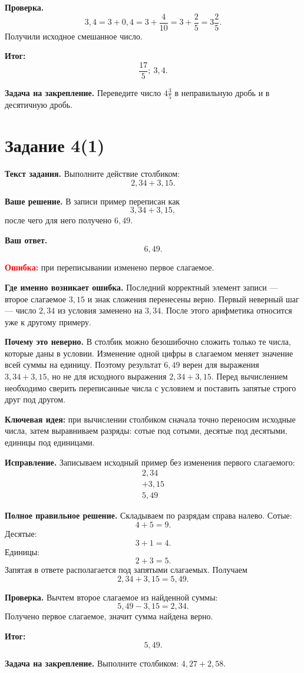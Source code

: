 \documentclass[12pt,a4paper]{article}
\begin{document}
\textbf{Проверка.}
\[
3{,}4=3+0{,}4=3+\frac{4}{10}=3+\frac25=3\frac25.
\]
Получили исходное смешанное число.

\textcolor{teal!60!black}{\textbf{Итог:}}
\[
\boxed{\frac{17}{5};\ 3{,}4}.
\]

\textbf{Задача на закрепление.}
Переведите число $4\frac35$ в неправильную дробь и в десятичную дробь.

\newpage
{}\label{task:4-1}
\section*{Задание 4(1)}

\textbf{Текст задания.}
Выполните действие столбиком:
\[
2{,}34+3{,}15.
\]

\textbf{Ваше решение.}
В записи пример переписан как
\[
3{,}34+3{,}15,
\]
после чего для него получено $6{,}49$.

\textbf{Ваш ответ.}
\[
6{,}49.
\]

\textcolor{red}{\textbf{Ошибка:}} при переписывании изменено первое слагаемое.

\textbf{Где именно возникает ошибка.}
Последний корректный элемент записи --- второе слагаемое $3{,}15$ и знак сложения перенесены верно. Первый неверный шаг --- число $2{,}34$ из условия заменено на $3{,}34$. После этого арифметика относится уже к другому примеру.

\textbf{Почему это неверно.}
В столбик можно безошибочно сложить только те числа, которые даны в условии. Изменение одной цифры в слагаемом меняет значение всей суммы на единицу. Поэтому результат $6{,}49$ верен для выражения $3{,}34+3{,}15$, но не для исходного выражения $2{,}34+3{,}15$. Перед вычислением необходимо сверить переписанные числа с условием и поставить запятые строго друг под другом.

\textcolor{blue!60!black}{\textbf{Ключевая идея:}} при вычислении столбиком сначала точно переносим исходные числа, затем выравниваем разряды: сотые под сотыми, десятые под десятыми, единицы под единицами.

\textbf{Исправление.}
Записываем исходный пример без изменения первого слагаемого:
\[
\begin{array}{r}
  2{,}34\\
+ 3{,}15\\
\hline
  5{,}49
\end{array}
\]

\textbf{Полное правильное решение.}
Складываем по разрядам справа налево. Сотые:
\[
4+5=9.
\]
Десятые:
\[
3+1=4.
\]
Единицы:
\[
2+3=5.
\]
Запятая в ответе располагается под запятыми слагаемых. Получаем
\[
2{,}34+3{,}15=5{,}49.
\]

\textbf{Проверка.}
Вычтем второе слагаемое из найденной суммы:
\[
5{,}49-3{,}15=2{,}34.
\]
Получено первое слагаемое, значит сумма найдена верно.

\textcolor{teal!60!black}{\textbf{Итог:}}
\[
\boxed{5{,}49}.
\]

\textbf{Задача на закрепление.}
Выполните столбиком: $4{,}27+2{,}58$.
\end{document}
